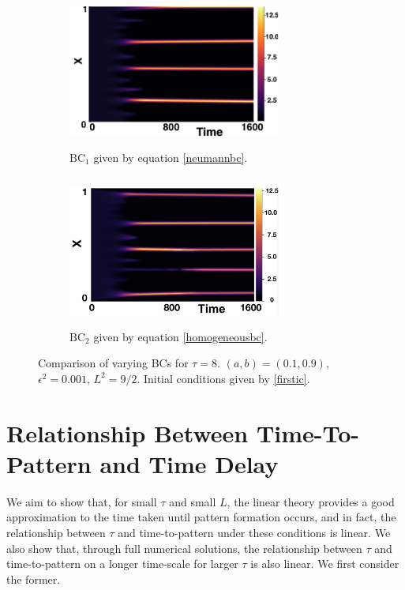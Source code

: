 \begin{figure}[H]
    \centering
    \begin{subfigure}[t]{0.45\textwidth}
        \centering
        \includegraphics[width=7cm,height=5cm]{ic28.png}
        \caption{$\text{BC}_1$ given by equation \eqref{neumannbc}.}
        \label{}
    \end{subfigure}
    \hfill
    \begin{subfigure}[t]{0.45\textwidth}
        \centering
        \includegraphics[width=7cm,height=5cm]{bc8.png}
        \caption{$\text{BC}_2$ given by equation \eqref{homogeneousbc}.}
        \label{}
    \end{subfigure}
    \caption{Comparison of varying BCs for $\tau=8$. $(a,b)=(0.1,0.9)$, $\epsilon^2=0.001$, $L^2=9/2$. Initial conditions given by \eqref{firstic}.}
    \label{fig:bctau3}
\end{figure}

\section{Relationship Between Time-To-Pattern and Time Delay}\label{section:delaypatt}

We aim to show that, for small $\tau$ and small $L$, the linear theory provides a good approximation to the time taken until pattern formation occurs, and in fact, the relationship between $\tau$ and time-to-pattern under these conditions is linear. We also show that, through full numerical solutions, the relationship between $\tau$ and time-to-pattern on a longer time-scale for larger $\tau$ is also linear. We first consider the former.

